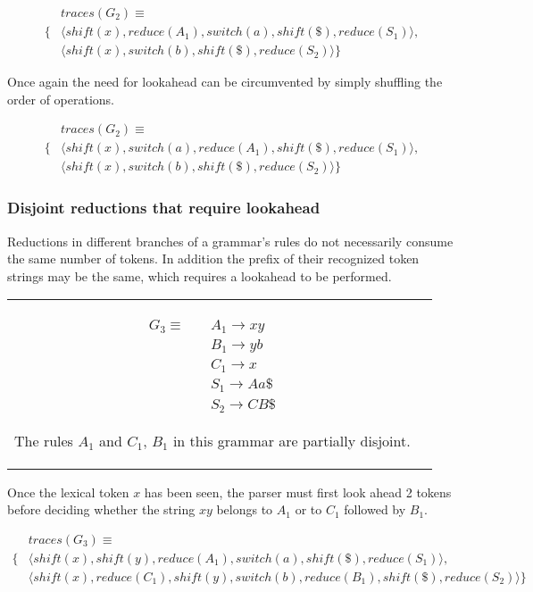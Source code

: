 \documentclass[a4paper,11pt]{article}
\begin{document}
{\small\parbox{.3\textwidth}{\begin{align*}
&traces(G_2) \equiv \\
\{ & \langle shift(x), reduce(A_1), switch(a), shift(\$), reduce(S_1) \rangle,\\
   & \langle shift(x), switch(b), shift(\$), reduce(S_2) \rangle \}
\end{align*}}}

Once again the need for lookahead can be circumvented by simply shuffling the order of operations.

{\small\parbox{.3\textwidth}{\begin{align*}
&traces(G_2) \equiv \\
\{ & \langle shift(x), switch(a), reduce(A_1), shift(\$), reduce(S_1) \rangle,\\
   & \langle shift(x), switch(b), shift(\$), reduce(S_2) \rangle \}
\end{align*}}}

\subsubsection{Disjoint reductions that require lookahead}
Reductions in different branches of a grammar's rules do not necessarily consume the same number of tokens. 
In addition the prefix of their recognized token strings may be the same, which requires a lookahead to be performed.\\
\begin{tabular}[t]{cl}
\parbox{.3\textwidth}{
\begin{align*}
G_3 \equiv \quad & A_1 \rightarrow x y\\
                 & B_1 \rightarrow y b\\
                 & C_1 \rightarrow x\\
                 & S_1 \rightarrow A a \$\\
                 & S_2 \rightarrow C B \$
\end{align*}}
\parbox{.6\textwidth}{The rules $A_1$ and $C_1$, $B_1$ in this grammar are partially disjoint.}
\end{tabular}

Once the lexical token $x$ has been seen, the parser must first look ahead 2 tokens before 
deciding whether the string $x y$ belongs to $A_1$ or to $C_1$ followed by $B_1$.

{\small\parbox{.3\textwidth}{\begin{align*}
&traces(G_3) \equiv \\
\{ & \langle shift(x), shift(y), reduce(A_1), switch(a), shift(\$), reduce(S_1) \rangle,\\
   & \langle shift(x), reduce(C_1), shift(y), switch(b), reduce(B_1), shift(\$), reduce(S_2) \rangle \}
\end{align*}}}
\end{document}
